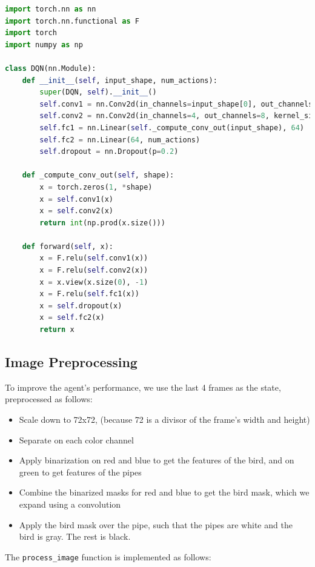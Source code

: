 \documentclass[a4paper,12pt]{article}
\begin{document}
\begin{lstlisting}[language=Python, caption=DQN Architecture]
import torch.nn as nn
import torch.nn.functional as F
import torch
import numpy as np

class DQN(nn.Module):
    def __init__(self, input_shape, num_actions):
        super(DQN, self).__init__()
        self.conv1 = nn.Conv2d(in_channels=input_shape[0], out_channels=4, kernel_size=8, stride=4)
        self.conv2 = nn.Conv2d(in_channels=4, out_channels=8, kernel_size=4, stride=2)
        self.fc1 = nn.Linear(self._compute_conv_out(input_shape), 64)
        self.fc2 = nn.Linear(64, num_actions)
        self.dropout = nn.Dropout(p=0.2)

    def _compute_conv_out(self, shape):
        x = torch.zeros(1, *shape)
        x = self.conv1(x)
        x = self.conv2(x)
        return int(np.prod(x.size()))

    def forward(self, x):
        x = F.relu(self.conv1(x))
        x = F.relu(self.conv2(x))
        x = x.view(x.size(0), -1)
        x = F.relu(self.fc1(x))
        x = self.dropout(x)
        x = self.fc2(x)
        return x
\end{lstlisting}

\subsection{Image Preprocessing}
To improve the agent's performance, we use the last 4 frames as the state, preprocessed as follows:
\begin{itemize}
    \item Scale down to 72x72, (because 72 is a divisor of the frame's width and height)
    \item Separate on each color channel
    \item Apply binarization on red and blue to get the features of the bird, and on green to get features of the pipes
    \item Combine the binarized masks for red and blue to get the bird mask, which we expand using a convolution
    \item Apply the bird mask over the pipe, such that the pipes are white and the bird is gray. The rest is black.
\end{itemize}

The \texttt{process\_image} function is implemented as follows:
\end{document}
